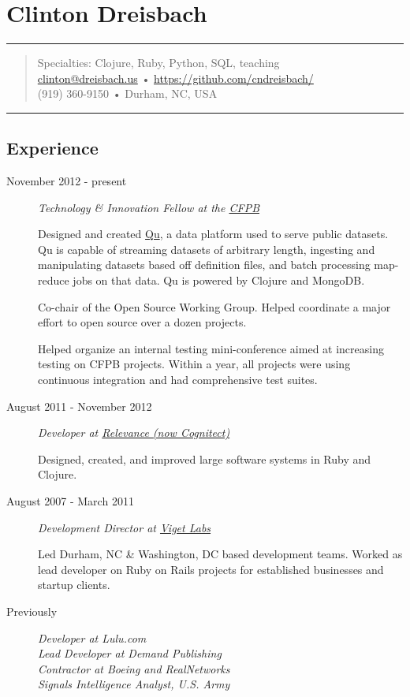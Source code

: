 \section{Clinton Dreisbach}\label{clinton-dreisbach}

\begin{center}\rule{3in}{0.4pt}\end{center}

\begin{quote}
Specialties: Clojure, Ruby, Python, SQL, teaching\\
\href{mailto:clinton@dreisbach.us}{clinton@dreisbach.us} •
\url{https://github.com/cndreisbach/}\\ (919) 360-9150 • Durham, NC, USA
\end{quote}

\begin{center}\rule{3in}{0.4pt}\end{center}

\subsection{Experience}\label{experience}

\begin{description}
\item[November 2012 - present]
\emph{Technology \& Innovation Fellow at the
\href{http://consumerfinance.gov}{CFPB}}

Designed and created \href{http://github.com/cfpb/qu}{Qu}, a data
platform used to serve public datasets. Qu is capable of streaming
datasets of arbitrary length, ingesting and manipulating datasets based
off definition files, and batch processing map-reduce jobs on that data.
Qu is powered by Clojure and MongoDB.

Co-chair of the Open Source Working Group. Helped coordinate a major
effort to open source over a dozen projects.

Helped organize an internal testing mini-conference aimed at increasing
testing on CFPB projects. Within a year, all projects were using
continuous integration and had comprehensive test suites.
\item[August 2011 - November 2012]
\emph{Developer at \href{http://cognitect.com/}{Relevance (now
Cognitect)}}

Designed, created, and improved large software systems in Ruby and
Clojure.
\item[August 2007 - March 2011]
\emph{Development Director at \href{http://viget.com/}{Viget Labs}}

Led Durham, NC \& Washington, DC based development teams. Worked as lead
developer on Ruby on Rails projects for established businesses and
startup clients.
\item[Previously]
\emph{Developer at Lulu.com}\\\emph{Lead Developer at Demand
Publishing}\\\emph{Contractor at Boeing and RealNetworks}\\\emph{Signals
Intelligence Analyst, U.S. Army}
\end{description}


